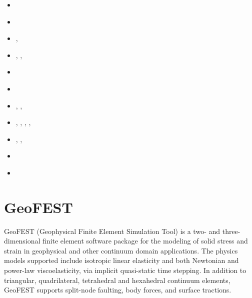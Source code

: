 \begin{small}
\begin{itemize}
\item[\twothousandeleven]      \textcite{dawk11}
\item[\twothousandtwelve]      \textcite{krwd12}
\item[\twothousandfourteen]    \textcite{gagd14},  \textcite{ledg14}
\item[\twothousandsixteen]     \textcite{dalg16},  \textcite{jodc16}, \textcite{pegp16} 
\item[\twothousandseventeen]   \textcite{hegd17}
\item[\twothousandeighteen]    \textcite{pegp18}
\item[\twothousandtwenty]      \textcite{algg20},  \textcite{mapg20}, 
                               \textcite{gatt20}
\item[\twothousandtwentyone]   \textcite{sugm21},  \textcite{kndc21},
                               \textcite{befd21},  \textcite{dudm21},
                               \textcite{gath21} 
\item[\twothousandtwentytwo]   \textcite{cesg22},  \textcite{chdg22a}, \textcite{chdg22b}
\item[\twothousandtwentythree] \textcite{pidh23} 
\item[\twothousandtwentyfour]  \textcite{chdg24} 

\end{itemize}
\end{small}



\section{GeoFEST} 
GeoFEST (Geophysical Finite Element Simulation Tool) is a two- and three-dimensional finite
element software package for the modeling of solid stress and strain in geophysical and 
other continuum domain applications.
The physics models supported include isotropic linear elasticity and both Newtonian and power-law
viscoelasticity, via implicit quasi-static time stepping. In addition to triangular, 
quadrilateral, tetrahedral and hexahedral continuum elements, GeoFEST supports split-node 
faulting, body forces, and surface tractions.


